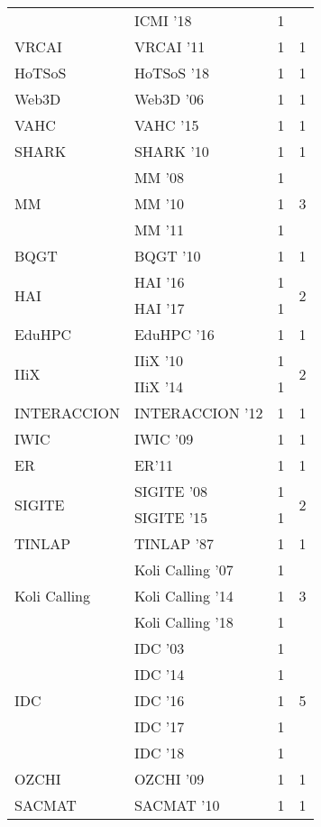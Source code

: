 \begin{table*}[t]
\begin{tabular}{llrr}
& ICMI '18 & 1 &\\
\multirow{1}{*}{VRCAI } & VRCAI '11 & 1 & \multirow{1}{*}{1}\\
\multirow{1}{*}{HoTSoS } & HoTSoS '18 & 1 & \multirow{1}{*}{1}\\
\multirow{1}{*}{Web3D } & Web3D '06 & 1 & \multirow{1}{*}{1}\\
\multirow{1}{*}{VAHC } & VAHC '15 & 1 & \multirow{1}{*}{1}\\
\multirow{1}{*}{SHARK } & SHARK '10 & 1 & \multirow{1}{*}{1}\\
\multirow{3}{*}{MM } & MM '08 & 1 & \multirow{3}{*}{3}\\
& MM '10 & 1 &\\
& MM '11 & 1 &\\
\multirow{1}{*}{BQGT } & BQGT '10 & 1 & \multirow{1}{*}{1}\\
\multirow{2}{*}{HAI } & HAI '16 & 1 & \multirow{2}{*}{2}\\
& HAI '17 & 1 &\\
\multirow{1}{*}{EduHPC } & EduHPC '16 & 1 & \multirow{1}{*}{1}\\
\multirow{2}{*}{IIiX } & IIiX '10 & 1 & \multirow{2}{*}{2}\\
& IIiX '14 & 1 &\\
\multirow{1}{*}{INTERACCION } & INTERACCION '12 & 1 & \multirow{1}{*}{1}\\
\multirow{1}{*}{IWIC } & IWIC '09 & 1 & \multirow{1}{*}{1}\\
\multirow{1}{*}{ER} & ER'11 & 1 & \multirow{1}{*}{1}\\
\multirow{2}{*}{SIGITE } & SIGITE '08 & 1 & \multirow{2}{*}{2}\\
& SIGITE '15 & 1 &\\
\multirow{1}{*}{TINLAP } & TINLAP '87 & 1 & \multirow{1}{*}{1}\\
\multirow{3}{*}{Koli Calling } & Koli Calling '07 & 1 & \multirow{3}{*}{3}\\
& Koli Calling '14 & 1 &\\
& Koli Calling '18 & 1 &\\
\multirow{5}{*}{IDC } & IDC '03 & 1 & \multirow{5}{*}{5}\\
& IDC '14 & 1 &\\
& IDC '16 & 1 &\\
& IDC '17 & 1 &\\
& IDC '18 & 1 &\\
\multirow{1}{*}{OZCHI } & OZCHI '09 & 1 & \multirow{1}{*}{1}\\
\multirow{1}{*}{SACMAT } & SACMAT '10 & 1 & \multirow{1}{*}{1}\\

\end{tabular}
\end{table*}
